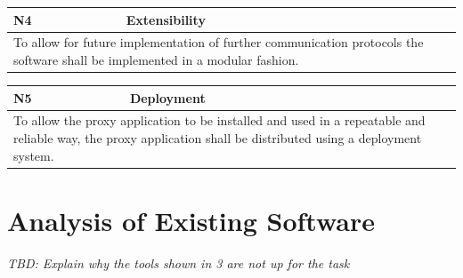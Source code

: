 \begin{center}
    \begin{tabular}{|p{1cm}|p{12cm}|}
        \hline
        \textbf{N4} & \textbf{Extensibility}                                                                                                                      \\ \hline
        \multicolumn{2}{|p{12cm}|}{To allow for future implementation of further communication protocols the software shall be implemented in a modular fashion.} \\ \hline
    \end{tabular}
\end{center}
\begin{center}
    \begin{tabular}{|p{1cm}|p{12cm}|}
        \hline
        \textbf{N5} & \textbf{Deployment}                                                                                                                                                           \\ \hline
        \multicolumn{2}{|p{12cm}|}{To allow the proxy application to be installed and used in a repeatable and reliable way, the proxy application shall be distributed using a deployment system.} \\ \hline
    \end{tabular}
\end{center}

\section{Analysis of Existing Software}
\label{sec:analysis-existing-software}
\emph{TBD: Explain why the tools shown in 3 are not up for the task}

